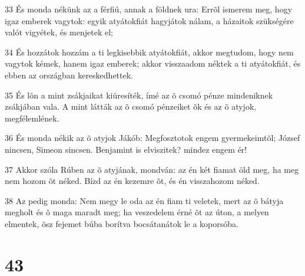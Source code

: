 \par 33 És monda nékünk az a férfiú, annak a földnek ura: Errõl ismerem meg, hogy igaz emberek vagytok: egyik atyátokfiát hagyjátok nálam, a házaitok szükségére valót vigyétek, és menjetek el;
\par 34 És hozzátok hozzám a ti legkisebbik atyátokfiát, akkor megtudom, hogy nem vagytok kémek, hanem igaz emberek; akkor visszaadom néktek a ti atyátokfiát, és ebben az országban kereskedhettek.
\par 35 És lõn a mint zsákjaikat kiüresíték, ímé az õ csomó pénze mindeniknek zsákjában vala. A mint látták az õ csomó pénzeiket õk és az õ atyjok, megfélemlének.
\par 36 És monda nékik az õ atyjok Jákób: Megfosztotok engem gyermekeimtõl; József nincsen, Simeon sincsen. Benjamint is elviszitek? mindez engem ér!
\par 37 Akkor szóla Rúben az õ atyjának, mondván: az én két fiamat öld meg, ha meg nem hozom õt néked. Bízd az én kezemre õt, és én visszahozom néked.
\par 38 Az pedig monda: Nem megy le oda az én fiam ti veletek, mert az õ bátyja megholt és õ maga maradt meg; ha veszedelem érné õt az úton, a melyen elmentek, õsz fejemet búba borítva bocsátanátok le a koporsóba.

\chapter{43}


